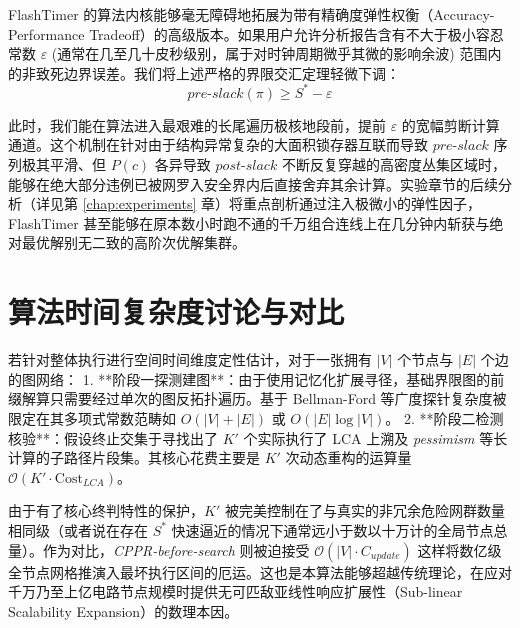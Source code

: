 FlashTimer 的算法内核能够毫无障碍地拓展为带有精确度弹性权衡（Accuracy-Performance Tradeoff）的高级版本。如果用户允许分析报告含有不大于极小容忍常数 $\varepsilon$ (通常在几至几十皮秒级别，属于对时钟周期微乎其微的影响余波) 范围内的非致死边界误差。我们将上述严格的界限交汇定理轻微下调：
\begin{equation}
    pre\text{-}slack(\pi) \ge S^* - \varepsilon
\end{equation}

此时，我们能在算法进入最艰难的长尾遍历极核地段前，提前 $\varepsilon$ 的宽幅剪断计算通道。这个机制在针对由于结构异常复杂的大面积锁存器互联而导致 $pre\text{-}slack$ 序列极其平滑、但 $P(c)$ 各异导致 $post\text{-}slack$ 不断反复穿越的高密度丛集区域时，能够在绝大部分违例已被网罗入安全界内后直接舍弃其余计算。实验章节的后续分析（详见第 \ref{chap:experiments} 章）将重点剖析通过注入极微小的弹性因子，FlashTimer 甚至能够在原本数小时跑不通的千万组合连线上在几分钟内斩获与绝对最优解别无二致的高阶次优解集群。

\section{算法时间复杂度讨论与对比}
\label{sec:algorithm_complexity}

若针对整体执行进行空间时间维度定性估计，对于一张拥有 $|V|$ 个节点与 $|E|$ 个边的图网络：
1. **阶段一探测建图**：由于使用记忆化扩展寻径，基础界限图的前缀解算只需要经过单次的图反拓扑遍历。基于 Bellman-Ford 等广度探针复杂度被限定在其多项式常数范畴如 $O(|V| + |E|)$ 或 $O(|E| \log |V|)$。
2. **阶段二检测核验**：假设终止交集于寻找出了 $K'$ 个实际执行了 LCA 上溯及 \textit{pessimism} 等长计算的子路径片段集。其核心花费主要是 $K'$ 次动态重构的运算量 $\mathcal{O}(K' \cdot \text{Cost}_{LCA})$。

由于有了核心终判特性的保护，$K'$ 被完美控制在了与真实的非冗余危险网群数量相同级（或者说在存在 $S^*$ 快速逼近的情况下通常远小于数以十万计的全局节点总量）。作为对比，\textit{CPPR-before-search} 则被迫接受 $\mathcal{O}(|V| \cdot C_{update})$ 这样将数亿级全节点网格推演入最坏执行区间的厄运。这也是本算法能够超越传统理论，在应对千万乃至上亿电路节点规模时提供无可匹敌亚线性响应扩展性（Sub-linear Scalability Expansion）的数理本因。